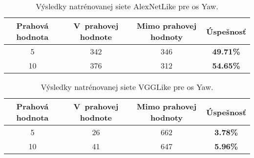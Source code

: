 \begin{table}[H]
    \centering
    \begin{tabular}{|c|c|c|c|}
        \hline
        Prahová hodnota & V~prahovej hodnote       & Mimo prahovej hodnoty    & Úspešnosť    \\ \hline
        5               & {\color[HTML]{009901} 342} & {\color[HTML]{9A0000} 346} & \textbf{49.71\%} \\ \hline
        10              & {\color[HTML]{009901} 376} & {\color[HTML]{9A0000} 312} & \textbf{54.65\%} \\ \hline
    \end{tabular}
    \caption{Výsledky natrénovanej siete AlexNetLike pre os Yaw.}
    \label{tab:alexnetyawresults}
\end{table}
\begin{table}[H]
    \centering
    \begin{tabular}{|c|c|c|c|}
        \hline
        Prahová hodnota & V~prahovej hodnote       & Mimo prahovej hodnoty    & Úspešnosť    \\ \hline
        5               & {\color[HTML]{009901} 26} & {\color[HTML]{9A0000} 662} & \textbf{3.78\%} \\ \hline
        10              & {\color[HTML]{009901} 41} & {\color[HTML]{9A0000} 647} & \textbf{5.96\%} \\ \hline
    \end{tabular}
    \caption{Výsledky natrénovanej siete VGGLike pre os Yaw.}
    \label{tab:vgglikeyawresults}
\end{table}
